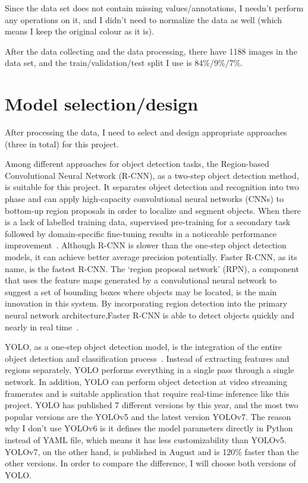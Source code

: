 \documentclass[runningheads]{llncs}
\begin{document}
Since the data set does not contain missing values/annotations, I needn't perform any operations on it, and I didn't need to normalize the data as well (which means I keep the original colour as it is). 

After the data collecting and the data processing, there have 1188 images in the data set, and the train/validation/test split I use is 84\%/9\%/7\%.


\section{Model selection/design}
After processing the data, I need to select and design appropriate approaches (three in total) for this project. 

Among different approaches for object detection tasks, the Region-based Convolutional Neural Network (R-CNN), as a two-step object detection method, is suitable for this project. It separates object detection and recognition into two phase and can apply high-capacity convolutional neural networks (CNNs) to bottom-up region proposals in order to localize and segment objects. When there is a lack of labelled training data, supervised pre-training for a secondary task followed by domain-specific fine-tuning results in a noticeable performance improvement~\cite{R-CNN}. Although R-CNN is slower than the one-step object detection models, it can achieve better average precision potentially. Faster R-CNN, as its name, is the fastest R-CNN. The `region proposal network' (RPN), a component that uses the feature maps generated by a convolutional neural network to suggest a set of bounding boxes where objects may be located, is the main innovation in this system. By incorporating region detection into the primary neural network architecture,Faster R-CNN is able to detect objects quickly and nearly in real time~\cite{Faster R-CNN}.

YOLO, as a one-step object detection model, is the integration of the entire object detection and classification process~\cite{YOLO}. Instead of extracting features and regions separately, YOLO performs everything in a single pass through a single network. In addition, YOLO can perform object detection at video streaming framerates and is suitable application that require real-time inference like this project. YOLO has published 7 different versions by this year, and the most two popular versions are the YOLOv5 and the latest version YOLOv7. The reason why I don't use YOLOv6 is it defines the model parameters directly in Python instead of YAML file, which means it has less customizability than YOLOv5. YOLOv7, on the other hand, is published in August and is 120\% faster than the other versions. In order to compare the difference, I will choose both versions of YOLO. 
\end{document}
